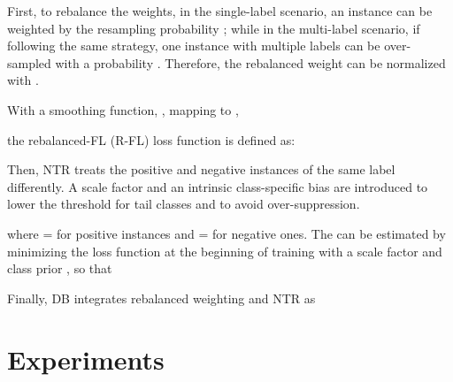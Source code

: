 \documentclass[11pt]{article}
\begin{document}
First, to rebalance the weights, in the single-label scenario, an instance can be weighted by the resampling probability ; while in the multi-label scenario, if following the same strategy, one instance with multiple labels can be over-sampled with a probability . Therefore, the rebalanced weight can be normalized with .
\begin{comment}
\small

\normalsize
\end{comment}
With a smoothing function, , mapping  to , 
\begin{comment}
\small

\normalsize
\end{comment}
the rebalanced-FL (R-FL) loss function is defined as:

\begin{comment}
\small

\normalsize
\end{comment}


\small
  
\normalsize


Then, NTR treats the positive and negative instances of the same label differently. A scale factor  and an intrinsic class-specific bias  are introduced to lower the threshold for tail classes and to avoid over-suppression. 

\begin{comment}
\small

\normalsize
\end{comment}

\small
  
\normalsize


where  =  for positive instances and  =  for negative ones.
The  can be estimated by minimizing the loss function at the beginning of training with a scale factor  and class prior , so that 

\small

\normalsize

Finally, DB integrates rebalanced weighting and NTR as

\begin{comment}
\small

\normalsize
\end{comment}


\small
  
\normalsize
 

\section{Experiments}
\end{document}
